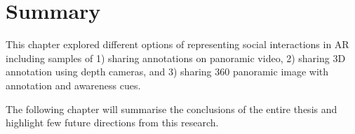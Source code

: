 \section{Summary}

This chapter explored different options of representing social interactions in AR including samples of 1) sharing annotations on panoramic video, 2) sharing 3D annotation using depth cameras, and 3) sharing 360 panoramic image with annotation and awareness cues. 

The following chapter will summarise the conclusions of the entire thesis and highlight few future directions from this research.

